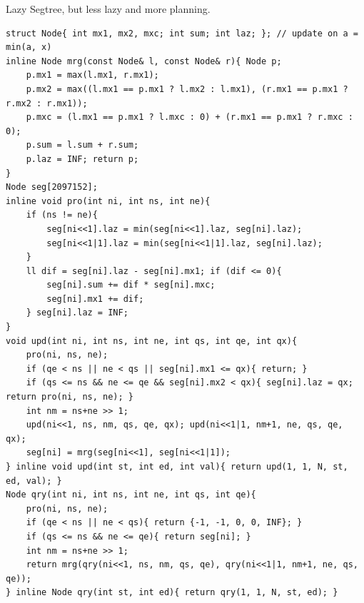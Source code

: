 Lazy Segtree, but less lazy and more planning.

\begin{verbatim}
struct Node{ int mx1, mx2, mxc; int sum; int laz; }; // update on a = min(a, x)
inline Node mrg(const Node& l, const Node& r){ Node p;
	p.mx1 = max(l.mx1, r.mx1);
	p.mx2 = max((l.mx1 == p.mx1 ? l.mx2 : l.mx1), (r.mx1 == p.mx1 ? r.mx2 : r.mx1));
	p.mxc = (l.mx1 == p.mx1 ? l.mxc : 0) + (r.mx1 == p.mx1 ? r.mxc : 0);
	p.sum = l.sum + r.sum;
	p.laz = INF; return p;
}
Node seg[2097152];
inline void pro(int ni, int ns, int ne){
	if (ns != ne){
		seg[ni<<1].laz = min(seg[ni<<1].laz, seg[ni].laz);
		seg[ni<<1|1].laz = min(seg[ni<<1|1].laz, seg[ni].laz);
	}
	ll dif = seg[ni].laz - seg[ni].mx1; if (dif <= 0){
		seg[ni].sum += dif * seg[ni].mxc;
		seg[ni].mx1 += dif;
	} seg[ni].laz = INF;
}
void upd(int ni, int ns, int ne, int qs, int qe, int qx){
	pro(ni, ns, ne);
	if (qe < ns || ne < qs || seg[ni].mx1 <= qx){ return; }
	if (qs <= ns && ne <= qe && seg[ni].mx2 < qx){ seg[ni].laz = qx; return pro(ni, ns, ne); }
	int nm = ns+ne >> 1;
	upd(ni<<1, ns, nm, qs, qe, qx); upd(ni<<1|1, nm+1, ne, qs, qe, qx);
	seg[ni] = mrg(seg[ni<<1], seg[ni<<1|1]);
} inline void upd(int st, int ed, int val){ return upd(1, 1, N, st, ed, val); }
Node qry(int ni, int ns, int ne, int qs, int qe){
	pro(ni, ns, ne);
	if (qe < ns || ne < qs){ return {-1, -1, 0, 0, INF}; }
	if (qs <= ns && ne <= qe){ return seg[ni]; }
	int nm = ns+ne >> 1;
	return mrg(qry(ni<<1, ns, nm, qs, qe), qry(ni<<1|1, nm+1, ne, qs, qe));
} inline Node qry(int st, int ed){ return qry(1, 1, N, st, ed); }
\end{verbatim}